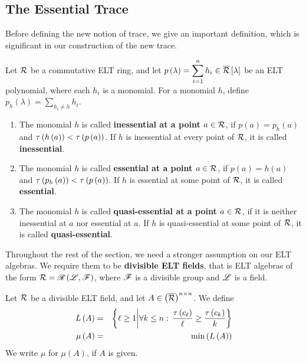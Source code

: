 \subsection{The Essential Trace}\label{sec:etr}

Before defining the new notion of trace, we give an important definition, which is significant in our construction of the new trace.
\begin{defn}
Let $\mathcal{R}$ be a commutative ELT ring, and let $\displaystyle{p\left(\lambda\right)=\sum_{i=1}^nh_i\in\overline{\mathcal{R}}\left[\lambda\right]}$ be an ELT polynomial, where each $h_i$ is a monomial. For a monomial $h$, define $\displaystyle{p_h\left(\lambda\right)=\sum_{h_i\neq h}h_i}$.
\begin{enumerate}
\item The monomial $h$ is called \textbf{inessential at a point $a\in\mathcal{R}$}, if $p\left(a\right)=p_h\left(a\right)$ and $\tau\left(h\left(a\right)\right)<\tau\left(p\left(a\right)\right)$.
    If $h$ is inessential at every point of $\mathcal{R}$, it is called \textbf{inessential}.
\item The monomial $h$ is called \textbf{essential at a point $a\in\mathcal{R}$}, if $p\left(a\right)=h\left(a\right)$ and $\tau\left(p_h\left(a\right)\right)<\tau\left(p\left(a\right)\right)$.
    If $h$ is essential at some point of $\mathcal{R}$, it is called \textbf{essential}.
\item The monomial $h$ is called \textbf{quasi-essential at a point $a\in\mathcal{R}$}, if it is neither inessential at $a$ nor essential at $a$.
    If $h$ is quasi-essential at some point of $\mathcal{R}$, it is called \textbf{quasi-essential}.
\end{enumerate}
\end{defn}

Throughout the rest of the section, we need a stronger assumption on our ELT algebras. We require them to be \textbf{divisible ELT fields}, that is ELT algebras of the form $\mathcal{R}=\mathscr{R}\left(\mathscr{L},\mathscr{F}\right)$, where $\mathscr{F}$ is a divisible group and $\mathscr{L}$ is a field.

\begin{defn}
Let $\mathcal{R}$ be a divisible ELT field, and let $A\in \left(\overline{\mathcal{R}}\right)^{n\times n}$. We define
\begin{eqnarray*}
L\left(A\right) & = & \left\{ \ell\ge1\middle|\forall k\leq n:\,\frac{\tau\left(c_{\ell}\right)}{\ell}\ge\frac{\tau\left(c_k\right)}{k}\right\} \\
\mu\left(A\right) & = & \min\left(L\left(A\right)\right)
\end{eqnarray*}
We write $\mu$ for $\mu\left(A\right)$, if $A$ is given.
\end{defn}

